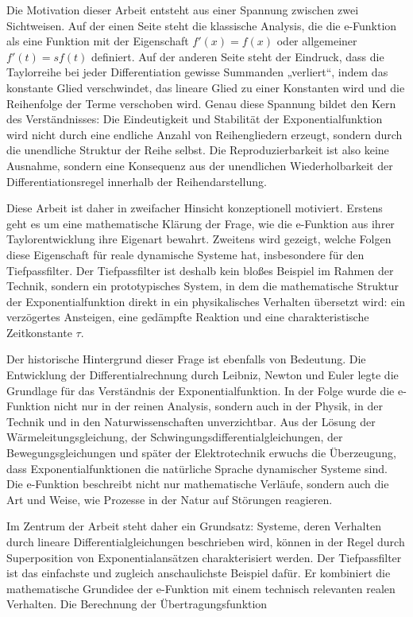 \documentclass[a4paper,12pt,twoside]{report}
\theoremstyle{definition}
\begin{document}
Die Motivation dieser Arbeit entsteht aus einer Spannung zwischen zwei Sichtweisen. Auf der einen Seite steht die klassische Analysis, die die e-Funktion als eine Funktion mit der Eigenschaft $f'(x)=f(x)$ oder allgemeiner $f'(t)=s f(t)$ definiert. Auf der anderen Seite steht der Eindruck, dass die Taylorreihe bei jeder Differentiation gewisse Summanden „verliert“, indem das konstante Glied verschwindet, das lineare Glied zu einer Konstanten wird und die Reihenfolge der Terme verschoben wird. Genau diese Spannung bildet den Kern des Verständnisses: Die Eindeutigkeit und Stabilität der Exponentialfunktion wird nicht durch eine endliche Anzahl von Reihengliedern erzeugt, sondern durch die unendliche Struktur der Reihe selbst. Die Reproduzierbarkeit ist also keine Ausnahme, sondern eine Konsequenz aus der unendlichen Wiederholbarkeit der Differentiationsregel innerhalb der Reihendarstellung.

Diese Arbeit ist daher in zweifacher Hinsicht konzeptionell motiviert. Erstens geht es um eine mathematische Klärung der Frage, wie die e-Funktion aus ihrer Taylorentwicklung ihre Eigenart bewahrt. Zweitens wird gezeigt, welche Folgen diese Eigenschaft für reale dynamische Systeme hat, insbesondere für den Tiefpassfilter. Der Tiefpassfilter ist deshalb kein bloßes Beispiel im Rahmen der Technik, sondern ein prototypisches System, in dem die mathematische Struktur der Exponentialfunktion direkt in ein physikalisches Verhalten übersetzt wird: ein verzögertes Ansteigen, eine gedämpfte Reaktion und eine charakteristische Zeitkonstante $\tau$.

Der historische Hintergrund dieser Frage ist ebenfalls von Bedeutung. Die Entwicklung der Differentialrechnung durch Leibniz, Newton und Euler legte die Grundlage für das Verständnis der Exponentialfunktion. In der Folge wurde die e-Funktion nicht nur in der reinen Analysis, sondern auch in der Physik, in der Technik und in den Naturwissenschaften unverzichtbar. Aus der Lösung der Wärmeleitungsgleichung, der Schwingungsdifferentialgleichungen, der Bewegungsgleichungen und später der Elektrotechnik erwuchs die Überzeugung, dass Exponentialfunktionen die natürliche Sprache dynamischer Systeme sind. Die e-Funktion beschreibt nicht nur mathematische Verläufe, sondern auch die Art und Weise, wie Prozesse in der Natur auf Störungen reagieren.

Im Zentrum der Arbeit steht daher ein Grundsatz: Systeme, deren Verhalten durch lineare Differentialgleichungen beschrieben wird, können in der Regel durch Superposition von Exponentialansätzen charakterisiert werden. Der Tiefpassfilter ist das einfachste und zugleich anschaulichste Beispiel dafür. Er kombiniert die mathematische Grundidee der e-Funktion mit einem technisch relevanten realen Verhalten. Die Berechnung der Übertragungsfunktion
\end{document}
